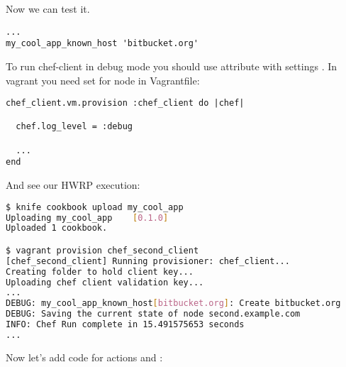 Now we can test it.

\begin{lstlisting}[label=lst:cookbook-hwrp6]
...
my_cool_app_known_host 'bitbucket.org'
\end{lstlisting}

To run chef-client in debug mode you should use  attribute with settings . In vagrant you need set  for node in Vagrantfile:

\begin{lstlisting}[label=lst:cookbook-hwrp7]
chef_client.vm.provision :chef_client do |chef|

  chef.log_level = :debug

  ...
end
\end{lstlisting}

And see our HWRP execution:

\begin{lstlisting}[language=Bash,label=lst:cookbook-hwrp8]
$ knife cookbook upload my_cool_app
Uploading my_cool_app    [0.1.0]
Uploaded 1 cookbook.

$ vagrant provision chef_second_client
[chef_second_client] Running provisioner: chef_client...
Creating folder to hold client key...
Uploading chef client validation key...
...
DEBUG: my_cool_app_known_host[bitbucket.org]: Create bitbucket.org
DEBUG: Saving the current state of node second.example.com
INFO: Chef Run complete in 15.491575653 seconds
...
\end{lstlisting}

Now let's add code for actions  and :

